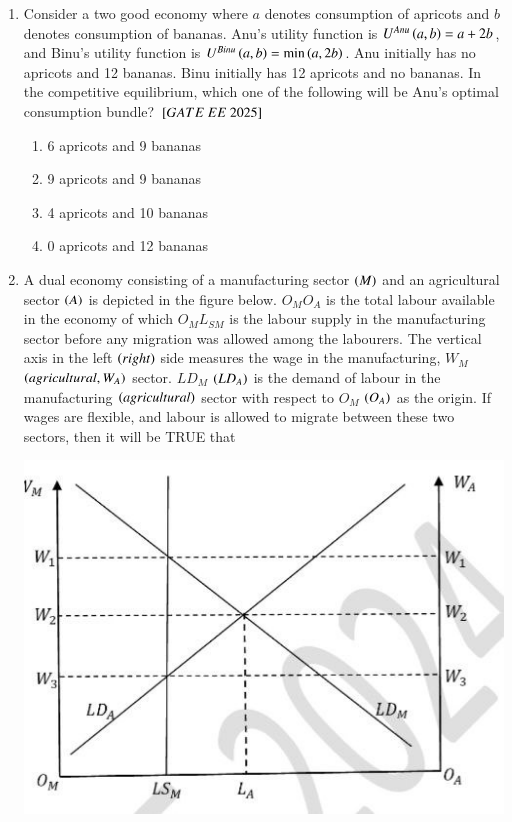 \documentclass[journal,12pt,onecolumn]{IEEEtran}
\theoremstyle{remark}
\begin{document}
\begin{enumerate}
\item Consider a two good economy where $a$ denotes consumption of apricots and $b$ denotes consumption of bananas. Anu's utility function is $U^{Anu} \left(a, b\right) = a + 2b$, and Binu's utility function is $U^{Binu} \left(a, b\right) = \min \left(a, 2b\right)$. Anu initially has no apricots and 12 bananas. Binu initially has 12 apricots and no bananas. In the competitive equilibrium, which one of the following will be Anu's optimal consumption bundle?
$\sbrak{GATE\ EE\ 2025}$\\
\begin{enumerate}[label=(\Alph*)]
    \item 6 apricots and 9 bananas
    \item 9 apricots and 9 bananas
    \item 4 apricots and 10 bananas
    \item 0 apricots and 12 bananas
\end{enumerate}
 
\item A dual economy consisting of a manufacturing sector  $\left(M\right)$ and an agricultural sector  $\left(A\right)$ is depicted in the figure below. $O_M O_A$ is the total labour available in the economy of which $O_M L_{SM}$ is the labour supply in the manufacturing sector before any migration was allowed among the labourers. The vertical axis in the left  $\left(right\right)$ side measures the wage in the manufacturing, $W_M$  $\left(agricultural, W_A\right)$ sector. $LD_M$  $\left(LD_A\right)$ is the demand of labour in the manufacturing  $\left(agricultural\right)$ sector with respect to $O_M$  $\left(O_A\right)$ as the origin. If wages are flexible, and labour is allowed to migrate between these two sectors, then it will be TRUE that

\includegraphics[scale=0.5]{figs/graph.jpg}


\end{enumerate}
\end{document}
